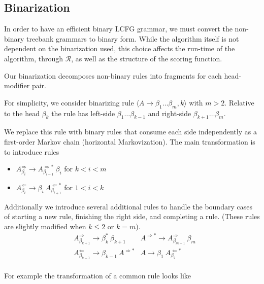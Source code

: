 \documentclass[11pt,letterpaper]{article}
\newcommand{\rules}{\mathcal{R}}
\newcommand{\Rule}[3]{#1 \rightarrow #2\ #3}
\newcommand{\RuleA}[3]{#1 \rightarrow #2^*\ #3}
\begin{document}
\subsection{Binarization}

In order to have an efficient binary LCFG grammar, we must convert the
non-binary treebank grammars to binary form.  While the algorithm
itself is not dependent on the binarization used, this choice affects
the run-time of the algorithm, through $\rules$, as well as the
structure of the scoring function.

Our binarization decomposes non-binary rules into fragments for
each head-modifier pair.

For simplicity, we consider binarizing rule $\langle A \rightarrow \beta_1 \ldots \beta_m,
k\rangle$ with $m > 2$. Relative to the head $\beta_k$
the rule has left-side $\beta_1 \ldots \beta_{k-1}$ and right-side
$\beta_{k+1} \ldots \beta_m$.

We replace this rule with binary rules that consume each side
independently as a first-order Markov chain (horizontal Markovization).
The main transformation is to introduce rules

\begin{itemize}

\item
$\Rule{A^{\Rightarrow}_{\beta_i}}{A^{\Rightarrow*}_{\beta_{i-1}}}{\beta_i}$ for $k < i < m$

\item
$\Rule{A^{\Leftarrow}_{\beta_i}} {\beta_i}{A^{\Leftarrow*}_{\beta_{i+1}}} $ for $1< i < k$
\end{itemize}



Additionally we introduce several additional rules to handle the boundary cases of starting a new rule, finishing the right side, and completing a rule. (These rules are slightly modified when $k\leq 2$ or $k=m$).
\begin{align*}
& \RuleA{A^{\Rightarrow}_{\beta_{k+1}}}{\beta_k}{\beta_{k+1}} & \Rule{A^{\Rightarrow*}} {A^{\Rightarrow}_{\beta_{m-1}}}{\beta_m} \\
 &\Rule{A^{\Leftarrow}_{\beta_{k-1}}}{\beta_{k-1}}{A^{\Rightarrow *}} & \Rule{A}{\beta_1}{ A^{\Leftarrow*}_{\beta_{2}}}\\
\end{align*}

\noindent For example the transformation of a common rule looks like
\end{document}
